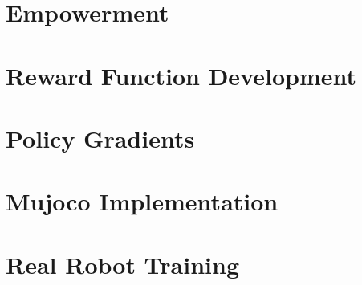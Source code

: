 \section{Empowerment}

\section{Reward Function Development}

\section{Policy Gradients}

\section{Mujoco Implementation}

\section{Real Robot Training}
